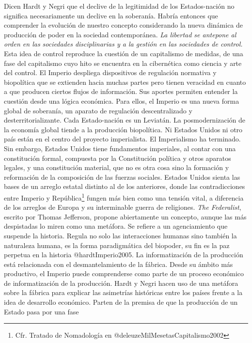 \documentclass[
]{article}
\begin{document}
Dicen Hardt y Negri que el declive de la legitimidad de los
Estados-nación no significa necesariamente un declive en la soberanía.
Habría entonces que comprender la evolución de nuestro concepto
considerando la nueva dinámica de producción de poder en la sociedad
contemporánea. \emph{La libertad se antepone al orden en las sociedades
disciplinarias y a la gestión en las sociedades de control.} Esta idea
de control reproduce la cuestión de un capitalismo de medidas, de una
fase del capitalismo cuyo hito se encuentra en la cibernética como
ciencia y arte del control. El Imperio despliega dispositivos de
regulación normativa y biopolítica que se extienden hacia muchas partes
pero tienen veracidad en cuanto a que producen ciertos flujos de
información. Sus aportes permiten entender la cuestión desde una lógica
económica. Para ellos, el Imperio es una nueva forma global de
soberanía, un aparato de regulación descentralizado y
desterritorializante. Cada Estado-nación es un Leviatán. La
posmodernización de la economía global tiende a la producción
biopolítica. Ni Estados Unidos ni otro país están en el centro del
proyecto imperialista. El Imperialismo ha terminado. Sin embargo,
Estados Unidos tiene fundamentos imperiales, al contar con una
constitución formal, compuesta por la Constitución política y otros
aparatos legales, y una constitución material, que no es otra cosa sino
la formación y reformación de la composición de las fuerzas sociales.
Estados Unidos sienta las bases de un arreglo estatal distinto al de los
anteriores, donde las contradicciones entre Imperio y
República\footnote{Cfr. Tratado de Nomadología en
  @deleuzeMilMesetasCapitalismo2002} fungen más bien como una tensión
vital, a diferencia de los arreglos de Europa y su interminable guerra
de religiones. \emph{The Federalist}, escrito por Thomas Jefferson,
propone abiertamente un concepto, aunque las más despistadas lo miren
como una metáfora. Se refiere a un agenciamiento que suspende la
historia. Regula no solo las interacciones humanas sino también la
naturaleza humana, es la forma paradigmática del biopoder, su fin es la
paz perpetua en la historia @hardtImperio2005. La informatización de la
producción está relacionada con el desmantelamiento de la fábrica. Desde
su ámbito más productivo, el Imperio puede comprenderse como parte de un
proceso económico de informatización de la producción. Hardt y Negri
hacen uso de una metáfora sobre la fábrica para explicar las asimetrías
históricas entre los países frente a la idea de desarrollo económico.
Parten de la premisa de que la producción de un Estado pasa por una fase
\end{document}
